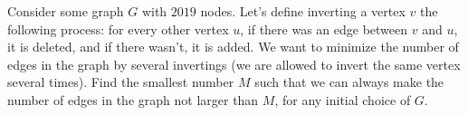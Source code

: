 Consider some graph $G$ with $2019$ nodes. Let's define inverting a vertex $v$ the following process: for every other vertex $u$,  if there was an edge between $v$ and $u$,  it is deleted, and if there wasn't, it is added. We want to minimize the number of edges in the graph by several invertings (we are allowed to invert the same vertex several times). Find the smallest number $M$ such that we can always make the number of edges in the graph not larger than $M$,  for any initial choice of $G$.